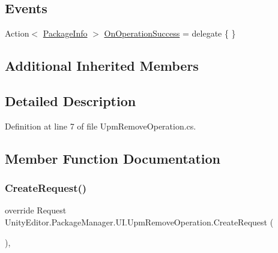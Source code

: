\subsection*{Events}
\begin{DoxyCompactItemize}
\item 
Action$<$ \mbox{\hyperlink{class_unity_editor_1_1_package_manager_1_1_u_i_1_1_package_info}{Package\+Info}} $>$ \mbox{\hyperlink{class_unity_editor_1_1_package_manager_1_1_u_i_1_1_upm_remove_operation_ad7753407c1cd02f6759b0c72ee15b0a9}{On\+Operation\+Success}} = delegate \{ \}
\end{DoxyCompactItemize}
\subsection*{Additional Inherited Members}


\subsection{Detailed Description}


Definition at line 7 of file Upm\+Remove\+Operation.\+cs.



\subsection{Member Function Documentation}
\mbox{\label{class_unity_editor_1_1_package_manager_1_1_u_i_1_1_upm_remove_operation_acc7b7b33d5e447aebc7cb9545f39eefb}} 
\subsubsection{\texorpdfstring{CreateRequest()}{CreateRequest()}}
{\footnotesize\ttfamily override Request Unity\+Editor.\+Package\+Manager.\+U\+I.\+Upm\+Remove\+Operation.\+Create\+Request (\begin{DoxyParamCaption}{ }\end{DoxyParamCaption})\hspace{0.3cm}{\ttfamily [protected]}, {\ttfamily [virtual]}}



